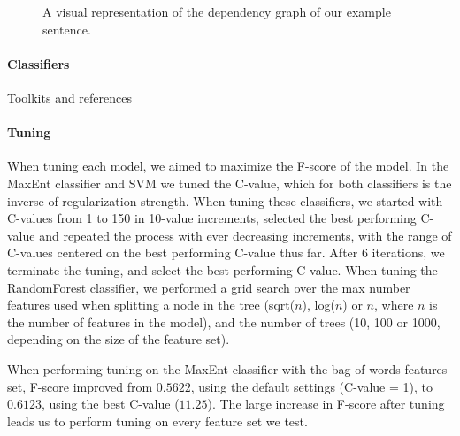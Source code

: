 \documentclass[11pt,letterpaper]{article}
\begin{document}
\begin{figure*}
  \begin{center}

    \caption{A visual representation of the dependency graph of our example sentence.}
    \label{fig:dependencygraph}
  \end{center}
\end{figure*}

\paragraph{Classifiers}
Toolkits and references
\paragraph{Tuning}
When tuning each model, we aimed to maximize the F-score of the model. In the MaxEnt classifier and SVM we tuned the C-value, which for both classifiers is the inverse of regularization strength. When tuning these classifiers, we started with C-values from 1 to 150 in 10-value increments, selected the best performing C-value and repeated the process with ever decreasing increments, with the range of C-values centered on the best performing C-value thus far. After 6 iterations, we terminate the tuning, and select the best performing C-value. When tuning the RandomForest classifier, we performed a grid search over the max number features used when splitting a node in the tree (sqrt($n$), log($n$) or $n$, where $n$ is the number of features in the model), and the number of trees (10, 100 or 1000, depending on the size of the feature set).

When performing tuning on the MaxEnt classifier with the bag of words features set, F-score improved from $0.5622$, using the default settings (C-value = 1), to $0.6123$, using the best C-value ($11.25$). The large increase in F-score after tuning leads us to perform tuning on every feature set we test.
\end{document}
